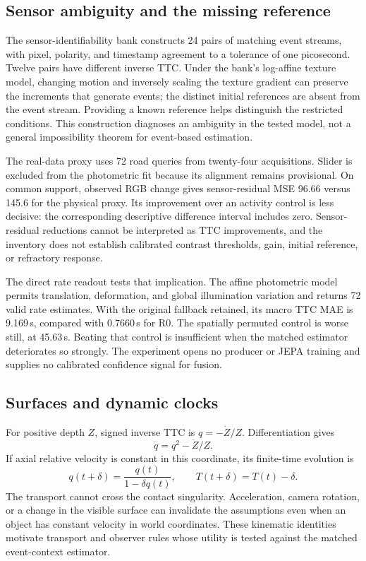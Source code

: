 \subsection{Sensor ambiguity and the missing reference}
The sensor-identifiability bank constructs 24 pairs of matching event streams, with pixel, polarity, and timestamp agreement to a tolerance of one picosecond. Twelve pairs have different inverse TTC. Under the bank's log-affine texture model, changing motion and inversely scaling the texture gradient can preserve the increments that generate events; the distinct initial references are absent from the event stream. Providing a known reference helps distinguish the restricted conditions. This construction diagnoses an ambiguity in the tested model, not a general impossibility theorem for event-based estimation. 

The real-data proxy uses 72 road queries from twenty-four acquisitions. Slider is excluded from the photometric fit because its alignment remains provisional. On common support, observed RGB change gives sensor-residual MSE 96.66 versus 145.6 for the physical proxy. Its improvement over an activity control is less decisive: the corresponding descriptive difference interval includes zero. Sensor-residual reductions cannot be interpreted as TTC improvements, and the inventory does not establish calibrated contrast thresholds, gain, initial reference, or refractory response.

The direct rate readout tests that implication. The affine photometric model permits translation, deformation, and global illumination variation and returns 72 valid rate estimates. With the original fallback retained, its macro TTC MAE is 9.169\,s, compared with 0.7660\,s for R0. The spatially permuted control is worse still, at 45.63\,s. Beating that control is insufficient when the matched estimator deteriorates so strongly. The experiment opens no producer or JEPA training and supplies no calibrated confidence signal for fusion. 

\subsection{Surfaces and dynamic clocks}
For positive depth $Z$, signed inverse TTC is $q=-\dot Z/Z$. Differentiation gives
\begin{equation}
 \dot q=q^2-\ddot Z/Z.
\end{equation}
If axial relative velocity is constant in this coordinate, its finite-time evolution is
\begin{equation}
 q(t+\delta)=\frac{q(t)}{1-\delta q(t)},\qquad T(t+\delta)=T(t)-\delta.
\end{equation}
The transport cannot cross the contact singularity. Acceleration, camera rotation,
or a change in the visible surface can invalidate the assumptions even when an
object has constant velocity in world coordinates. These kinematic identities motivate transport and observer rules whose utility is tested against the matched event-context estimator. 

